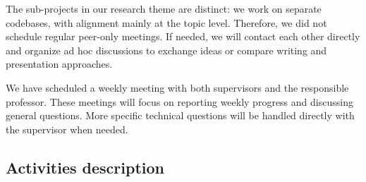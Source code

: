 \documentclass[english, a4paper]{article}
\begin{document}
The sub-projects in our research theme are distinct: we work on separate codebases, with alignment mainly at the topic level. Therefore, we did not schedule regular peer-only meetings. If needed, we will contact each other directly and organize ad hoc discussions to exchange ideas or compare writing and presentation approaches.

We have scheduled a weekly meeting with both supervisors and the responsible professor. These meetings will focus on reporting weekly progress and discussing general questions. More specific technical questions will be handled directly with the supervisor when needed.

\subsection*{Activities description}
\end{document}
